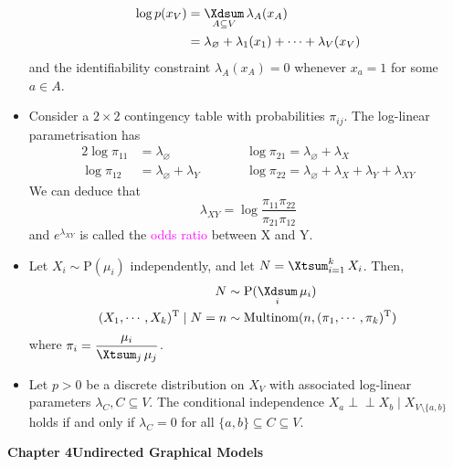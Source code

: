 \documentclass[UTF8]{book}
\DeclareMathOperator*{\Xsum}{\mathchoice{\Xdsum}{\Xtsum}{\Xtsum}{\Xtsum}}
\newcommand{\perpp}{\ensuremath{\perp\!\!\!\!\!\perp}}
\newcommand{\et}{&}
\newcommand{\concept}[1]{\textcolor{magenta}{#1}}
\renewcommand{\t}{\ensuremath{^\mathrm{T}}}
\begin{document}
\begin{itemize}
\begin{align*}
	\log p(x_V) \et = \Xsum_{A\subseteq V}\lambda_A(x_A)\\
	\et = \lambda_{\varnothing} + \lambda_1(x_1)+\cdots+\lambda_V(x_V)
\end{align*}
and the identifiability constraint $\lambda_A(x_A) = 0$ whenever $x_a = 1$ for some $a\in A$.
\item Consider a $2\times 2$ contingency table with probabilities $\pi_{ij}$. The log-linear parametrisation has
\begin{alignat*}{2}
\log\pi_{11} \et = \lambda_{\varnothing} \qquad \et\et\log\pi_{21}  = \lambda_{\varnothing} + \lambda_X \\
\log\pi_{12} \et = \lambda_{\varnothing} + \lambda_Y \qquad \et\et\log\pi_{22}  = \lambda_{\varnothing} + \lambda_X + \lambda_Y + \lambda_{XY}
\end{alignat*}
We can deduce that 
$$
\lambda_{XY} = \log\dfrac{\pi_{11}\pi_{22}}{\pi_{21}\pi_{12}}
$$
and $e^{\lambda_{XY}}$ is called the \concept{odds ratio} between X and Y.
\item Let $X_i\sim \mathrm{P}(\mu_i)$ independently, and let $N=\Xsum_{i=1}^k X_i$. Then,
\begin{align*}
	N \et \sim \mathrm{P}(\Xsum_i\mu_i)\\
	(X_1,\cdots,X_k)\t\mid N = n\et \sim \mathrm{Multinom}(n, (\pi_1,\cdots,\pi_k)\t)
\end{align*}
where $\pi_i = \dfrac{\mu_i}{\Xsum_j\mu_j}$.
\item Let $p>0$ be a discrete distribution on $X_V$ with associated log-linear parameters $\lambda_C, C\subseteq V$. The conditional independence $X_a\perpp X_b\mid X_{V\setminus\{a,b\}}$ holds if and only if $\lambda_C = 0$ for all $\{a,b\}\subseteq C\subseteq V$.
\end{itemize}
\large{\textbf{Chapter 4\quad Undirected Graphical Models}}
\end{document}

